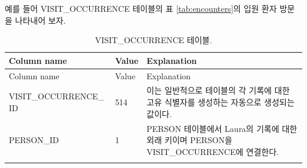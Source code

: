 \documentclass[11pt]{book}
\theoremstyle{definition}
\theoremstyle{definition}
\theoremstyle{definition}
\theoremstyle{remark}
\begin{document}
예를 들어 VISIT\_OCCURRENCE 테이블의 표 \ref{tab:encounters}의 입원 환자
방문을 나타내어 보자.

\begin{longtable}[]{@{}lll@{}}
\caption{\label{tab:visitOccurrence} VISIT\_OCCURRENCE
테이블.}\tabularnewline
\toprule
\begin{minipage}[b]{0.28\columnwidth}\raggedright\strut
Column name\strut
\end{minipage} & \begin{minipage}[b]{0.16\columnwidth}\raggedright\strut
Value\strut
\end{minipage} & \begin{minipage}[b]{0.48\columnwidth}\raggedright\strut
Explanation\strut
\end{minipage}\tabularnewline
\midrule
\endfirsthead
\toprule
\begin{minipage}[b]{0.28\columnwidth}\raggedright\strut
Column name\strut
\end{minipage} & \begin{minipage}[b]{0.16\columnwidth}\raggedright\strut
Value\strut
\end{minipage} & \begin{minipage}[b]{0.48\columnwidth}\raggedright\strut
Explanation\strut
\end{minipage}\tabularnewline
\midrule
\endhead
\begin{minipage}[t]{0.28\columnwidth}\raggedright\strut
VISIT\_OCCURRENCE\_ ID\strut
\end{minipage} & \begin{minipage}[t]{0.16\columnwidth}\raggedright\strut
514\strut
\end{minipage} & \begin{minipage}[t]{0.48\columnwidth}\raggedright\strut
이는 일반적으로 테이블의 각 기록에 대한 고유 식별자를 생성하는 자동으로
생성되는 값이다.\strut
\end{minipage}\tabularnewline
\begin{minipage}[t]{0.28\columnwidth}\raggedright\strut
PERSON\_ID\strut
\end{minipage} & \begin{minipage}[t]{0.16\columnwidth}\raggedright\strut
1\strut
\end{minipage} & \begin{minipage}[t]{0.48\columnwidth}\raggedright\strut
PERSON 테이블에서 Laura의 기록에 대한 외래 키이며 PERSON을
VISIT\_OCCURRENCE에 연결한다.\strut
\end{minipage}\tabularnewline
\begin{minipage}[t]{0.28\columnwidth}\raggedright\strut

\end{minipage}
\end{longtable}
\end{document}
